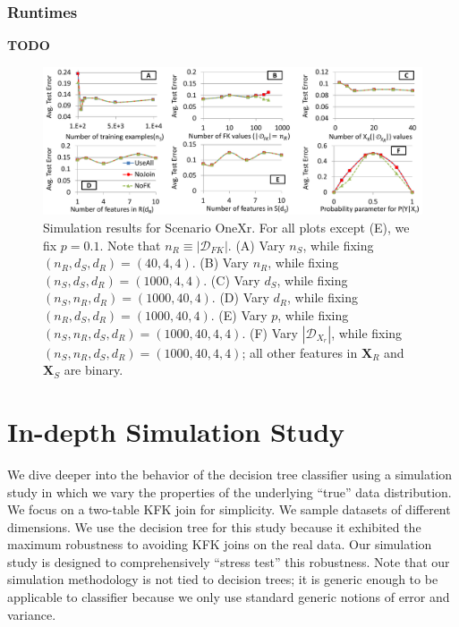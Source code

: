 \documentclass{vldb}
\begin{document}


\subsubsection*{Runtimes}

\textbf{TODO}

\begin{figure}[t]
\centering
\includegraphics[width=0.85\linewidth]{onexr.pdf}
\caption{Simulation results for Scenario OneXr. For all plots except (E), we fix $p = 0.1$. Note that $n_R \equiv |\mathcal{D}_{FK}|$.
(A) Vary $n_S$, while fixing $(n_R, d_S, d_R) = (40, 4, 4)$.
(B) Vary $n_R$, while fixing $(n_S, d_S, d_R) = (1000, 4, 4)$.
(C) Vary $d_S$, while fixing $(n_S, n_R, d_R) = (1000, 40, 4)$.
(D) Vary $d_R$, while fixing $(n_R, d_S, d_R) = (1000, 40, 4)$.
(E) Vary $p$,  while fixing $(n_S, n_R, d_S, d_R) = (1000, 40, 4, 4)$.
(F) Vary $|\mathcal{D}_{X_r}|$, while fixing $(n_S, n_R, d_S, d_R) = (1000, 40, 4, 4)$; all other features in $\textbf{X}_R$ and $\textbf{X}_S$ are binary.
}
\label{Figure:OneXrSimulation}
\end{figure}

\section{In-depth Simulation Study}	

We dive deeper into the behavior of the decision tree classifier using a simulation study in which we vary the properties of the 
underlying ``true'' data distribution. We focus on a two-table KFK join for simplicity. We sample datasets of different dimensions.
We use the decision tree for this study because it exhibited the maximum robustness to avoiding KFK joins on the real data. 
Our simulation study is designed to comprehensively ``stress test'' this robustness.
Note that our simulation methodology is not tied to decision trees; it is generic enough to be applicable to classifier because we only 
use standard generic notions of error and variance.
\end{document}
